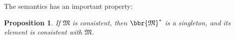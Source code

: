 \documentclass{article}
\theoremstyle{plain}
\newtheorem{prop}[theorem]{Proposition}
\theoremstyle{definition}
\theoremstyle{remark}
\DeclareMathOperator*{\argmin}{arg\;min}
\newcommand{\commentout}[1]{\ignorespaces}
\newcommand{\V}{\mathcal V}
\newcommand{\dg}[1]{\mathfrak{#1}}
\numberwithin{equation}{section}
\begin{document}
\commentout{
\begin{prop}\label{prop:convex-if-gamma-small}
  If $\dg M$ is a PDG and
  $\gamma < \min_L \beta_L^{\dg M}$, then
  $\bbr{\dg M}_\gamma$ is a strictly convex function of $\mu$.%
\end{prop}

                          
                          
\Cref{prop:convex-if-gamma-small} allows us to define our desired
semantics by ensuring the limit%
	\footnote{$\mu$ is in this limit iff there is a sequence $(\gamma_i, \mu_i)_{i \in \mathbb N}$ with $\gamma_i \to 0$ and $\mu_i \to \mu$ such that $\mu_i \in \bbr{\dg M}_{\gamma_i}$ for all $i$.}
 in \eqref{eq:uniqdist} is well-defined.
	
	\begin{equation}
		 \bbr{\dg M}_* := \lim_{\gamma\to 0^+}\argmin_{\mu \in
				   \Delta\V(\dg M)} \bbr{\dg M}_\gamma(\mu). 
		   \label{eq:uniqdist}
	\end{equation}
}

The semantics has an important property: 
\begin{prop}\label{prop:consist}
If $\dg M$ is consistent,
then $\bbr{\dg M}^*$ is a singleton, and its 
element is
consistent with ${\dg M}$.  
\end{prop}

\end{document}
